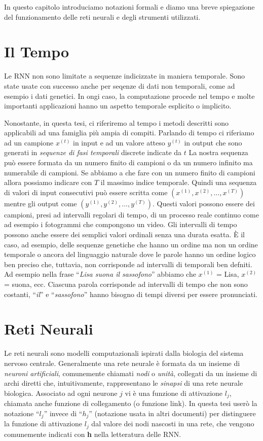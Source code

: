 In questo capitolo introduciamo notazioni formali e diamo una breve spiegazione del funzionamento delle reti neurali e degli strumenti utilizzati.

\section{Il Tempo}

Le RNN non sono limitate a sequenze indicizzate in maniera temporale.
Sono state usate con successo anche per seqenze di dati non temporali, come ad esempio i dati genetici.
In ongi caso, la computazione procede nel tempo e molte importanti applicazioni hanno un aspetto temporale esplicito o implicito.

Nonostante, in questa tesi, ci riferiremo al tempo i metodi descritti sono applicabili ad una famiglia pi\`u ampia di compiti.
Parlando di tempo ci riferiamo ad un campione $x^{(t)}$ in input e ad un valore atteso $y^{(t)}$ in output che sono generati in \emph{sequenze di fasi temporali} discrete indicate da $t$
La nostra sequenza pu\`o essere formata da un numero finito di campioni o da un numero infinito ma numerabile di campioni.
Se abbiamo a che fare con un numero finito di campioni allora possiamo indicare con $T$ il massimo indice temporale.
Quindi una sequenza di valori di input consecutivi pu\`o essere scritta come $(x^{(1)}, x^{(2)}, \dots, x^{(T)})$ mentre gli output come $(y^{(1)}, y^{(2)}, \dots, y^{(T)})$.
Questi valori possono essere dei campioni, presi ad intervalli regolari di tempo, di un processo reale continuo come ad esempio i fotogrammi che compongono un video.
Gli intervalli di tempo possono anche essere dei semplici valori ordinali senza una durata esatta.
\`E il caso, ad esempio, delle sequenze genetiche che hanno un ordine ma non un ordine temporale o ancora del linguaggio naturale dove le parole hanno un ordine logico ben preciso che, tuttavia, non corrisponde ad intervalli di temporali ben defniti.
Ad esempio nella frase ``\emph{Lisa suona il sassofono}'' abbiamo che $x^{(1)}$ = Lisa, $x^{(2)}$ = suona, ecc. Ciascuna parola corrisponde ad intervalli di tempo che non sono costanti, ``\emph{il}'' e ``\emph{sassofono}'' hanno bisogno di tempi diversi per essere pronunciati.

\section{Reti Neurali}
Le reti neurali sono modelli computazionali ispirati dalla biologia del sistema nervoso centrale.
Generalmente una rete neurale \`e formata da un insieme di \emph{neuroni artificiali}, comunemente chiamati \emph{nodi} o \emph{unit\`a}, collegati da un insieme di archi diretti che, intuitivamente, rappresentano le \emph{sinapsi} di una rete neurale biologica.
Associato ad ogni neurone $j$ vi \`e una funzione di attivazione $l_j$, chiamata anche funzione di collegamento (o funzione link).
In questa tesi user\`o la notazione ``$l_j$'' invece di ``$h_j$'' (notazione usata in altri documenti) per distinguere la funzione di attivazione $l_j$ dal valore dei nodi nascosti in una rete, che vengono comunemente indicati con \textbf{h} nella letteratura delle RNN.

